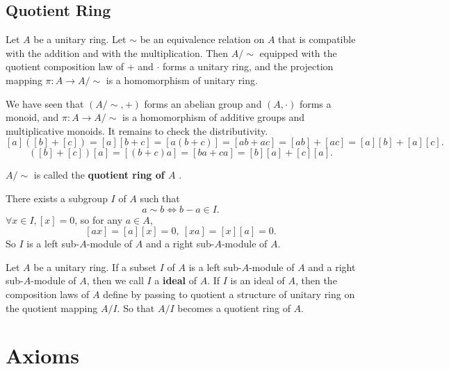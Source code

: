\documentclass{book}
\numberwithin{equation}{section}
\begin{document}
\section{Quotient Ring}
\begin{propositionenv}
    Let $A$ be a unitary ring. Let $\sim$ be an equivalence relation on $A$ that is compatible with the addition and with the multiplication. Then $A/\sim$ equipped with the quotient composition law of $+$ and $\cdot$ forms a unitary ring, and the projection mapping $\pi:A\longrightarrow A/\sim$ is a homomorphism of unitary ring.
\end{propositionenv}
\begin{proofenv}
    We have seen that $(A/\sim,+)$ forms an abelian group and $(A,\cdot)$ forms a monoid, and $\pi:A\longrightarrow A/\sim$ is a homomorphism of additive groups and multiplicative monoids. It remains to check the distributivity.
    $$[a]([b]+[c])=[a][b+c]=[a(b+c)]=[ab+ac]=[ab]+[ac]=[a][b]+[a][c].$$
    $$([b]+[c])[a]=[(b+c)a]=[ba+ca]=[b][a]+[c][a].$$
\end{proofenv}
\begin{definitionenv}
    $A/\sim$ is called the \textbf{quotient ring of $A$ }.
\end{definitionenv}
\begin{remark}
    There exists a subgroup $I$ of $A$ such that 
    $$a\sim b\Leftrightarrow b-a\in I.$$
    $\forall x\in I,[x]=0$, so  for any $ a\in A$,
    $$[ax]=[a][x]=0,\ [xa]=[x][a]=0.$$
    So $I$ is a left sub-$A$-module of $A$ and a right sub-$A$-module of $A$.
\end{remark}
\begin{definitionenv}
    Let $A$ be a unitary ring. If a subset $I$ of $A$ is a left sub-$A$-module of $A$ and a right sub-$A$-module of $A$, then we call $I$ a \textbf{ideal} of $A$. If $I$ is an ideal of $A$, then the composition laws of $A$ define by passing to quotient a structure of unitary ring on the quotient mapping $A/I$. So that $A/I$ becomes a quotient ring of $A$.
\end{definitionenv}







\appendix












\chapter{Axioms}
\end{document}
